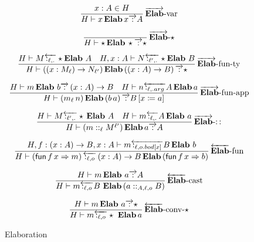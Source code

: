 \begin{figure}
\[
\frac{
 x:A\in H
}{
 H\vdash x\,\textbf{Elab}\,x\overrightarrow{\,:\,}A
}
\operatorname{\overrightarrow{\textbf{Elab}}-var}
\]

\[
\frac{\,}{H\vdash\star\,\textbf{Elab}\,\star\overrightarrow{\,:\,}\star}
\operatorname{\overrightarrow{\textbf{Elab}}-\star}
\]

\[
\frac{
 H\vdash M\overleftarrow{\,:_{\ell,.}\,}\star\textbf{Elab}\ A\quad H,x:A\vdash N\overleftarrow{\,:_{\ell',.}\,}\star\textbf{Elab}\ B
}{
 H\vdash\left(\left(x:M_{\ell}\right)\rightarrow N_{\ell'}\right)\textbf{Elab}\left(\left(x:A\right)\rightarrow B\right)\overrightarrow{\,:\,}\star
}
\operatorname{\overrightarrow{\textbf{Elab}}-fun-ty}
\]

\[
\frac{H\vdash m\,\textbf{Elab}\ b\overrightarrow{\,:\,}\left(x:A\right)\rightarrow B\quad H\vdash n\overleftarrow{\,:_{\ell,.arg}\,}A\,\textbf{Elab}\,a}{H\vdash\left(m_{\ell}\,n\right)\textbf{Elab}\left(b\,a\right)\overrightarrow{\,:\,}B\left[x\coloneqq a\right]}\rulename{\overrightarrow{\textbf{Elab}}-fun-app}
\]

\[
\frac{H\vdash M\overleftarrow{\,:_{\ell',.}\,}\star\,\textbf{Elab}\ A\quad H\vdash m\overleftarrow{\,:_{\ell,.}\,}A\,\textbf{Elab}\ a}{H\vdash\left(m::_{\ell}M^{\ell'}\right)\textbf{Elab}\,a\overrightarrow{\,:\,}A}\rulename{\overrightarrow{\textbf{Elab}}-::}
\]

\[
\frac{H,f:\left(x:A\right)\rightarrow B,x:A\vdash m\overleftarrow{\,:_{\ell,o.bod[x]}\,}B\,\textbf{Elab}\ b}{H\vdash\left(\mathsf{fun}\,f\,x\Rightarrow m\right)\overleftarrow{\,:_{\ell,o}\,}\left(x:A\right)\rightarrow B\,\textbf{Elab}\left(\mathsf{fun}\,f\,x\Rightarrow b\right)}\rulename{\overleftarrow{\textbf{Elab}}-fun}
\]

\[
\frac{H\vdash m\,\textbf{Elab}\ a\overrightarrow{\,:\,}A}{H\vdash m\overleftarrow{\,:_{\ell,o}\,}B\ \textbf{Elab}\left(a::_{A,\ell,o}B\right)}\rulename{\overleftarrow{\textbf{Elab}}-cast}
\]

\[
\frac{H\vdash m\,\textbf{Elab}\ a\overrightarrow{\,:\,}\star}{H\vdash m\overleftarrow{\,:_{\ell,o}\,}\star\ \textbf{Elab}\,a}\rulename{\overleftarrow{\textbf{Elab}}-conv-\star}
\]


\caption{Elaboration}
\label{fig:elaboration}
\end{figure}

